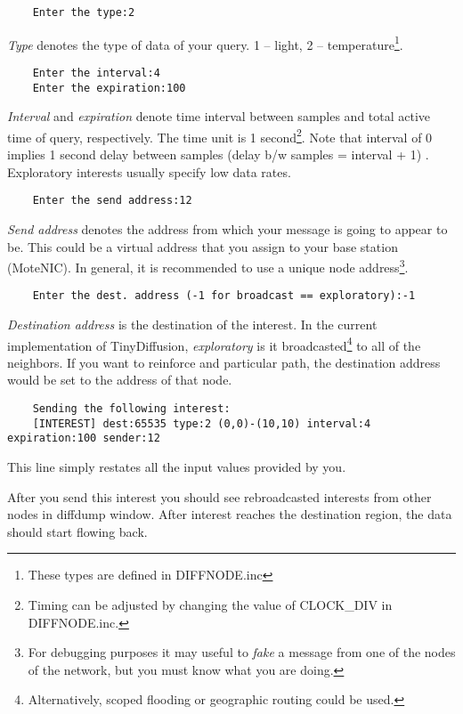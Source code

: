 \documentclass[11pt,onecolumn]{article}
\begin{document}
\begin{verbatim}
	Enter the type:2
\end{verbatim}
\emph{Type} denotes the type of data of your query. 1 -- light, 2 --
temperature\footnote{These types are defined in DIFFNODE.inc}.
\begin{verbatim}
	Enter the interval:4
	Enter the expiration:100
\end{verbatim}
\emph{Interval} and \emph{expiration} denote time interval between
samples and total active time of query, respectively. The time unit is
1 second\footnote{Timing can be adjusted by changing the value of
CLOCK\_DIV in DIFFNODE.inc.}. Note that interval of 0 implies 1 second
delay between samples (delay b/w samples = interval + 1) . Exploratory
interests usually specify low data rates.
\begin{verbatim}
	Enter the send address:12
\end{verbatim}
\emph{Send address} denotes the address from which your message is going to
appear to be. This could be a virtual address that you assign to your
base station (MoteNIC). In general, it is recommended to use a unique
node address\footnote{For debugging purposes it may useful to
\emph{fake} a message from one of the nodes of the network, but you
must know what you are doing.}.
\begin{verbatim}
	Enter the dest. address (-1 for broadcast == exploratory):-1
\end{verbatim}
\emph{Destination address} is the destination of the interest. In the
current implementation of TinyDiffusion, \emph{exploratory} is it
broadcasted\footnote{Alternatively, scoped flooding or geographic
routing could be used.} to all of the neighbors. If you want to
reinforce and particular path, the destination address would be set to
the address of that node.
\begin{verbatim}
	Sending the following interest:
	[INTEREST] dest:65535 type:2 (0,0)-(10,10) interval:4 expiration:100 sender:12
\end{verbatim}
This line simply restates all the input values provided by you.

After you send this interest you should see rebroadcasted interests
from other nodes in diffdump window. After interest reaches the
destination region, the data should start flowing back.
\end{document}
